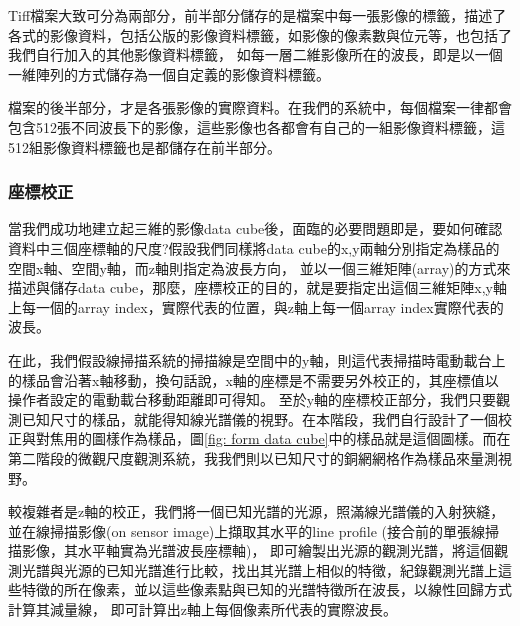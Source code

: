 \documentclass[12pt]{article}
\begin{document}
Tiff檔案大致可分為兩部分，前半部分儲存的是檔案中每一張影像的標籤，描述了各式的影像資料，包括公版的影像資料標籤，如影像的像素數與位元等，也包括了我們自行加入的其他影像資料標籤，
如每一層二維影像所在的波長，即是以一個一維陣列的方式儲存為一個自定義的影像資料標籤。

檔案的後半部分，才是各張影像的實際資料。在我們的系統中，每個檔案一律都會包含512張不同波長下的影像，這些影像也各都會有自己的一組影像資料標籤，這512組影像資料標籤也是都儲存在前半部分。

\subsubsection{座標校正}
當我們成功地建立起三維的影像data cube後，面臨的必要問題即是，要如何確認資料中三個座標軸的尺度?假設我們同樣將data cube的x,y兩軸分別指定為樣品的空間x軸、空間y軸，而z軸則指定為波長方向，
並以一個三維矩陣(array)的方式來描述與儲存data cube，那麼，座標校正的目的，就是要指定出這個三維矩陣x,y軸上每一個的array index，實際代表的位置，與z軸上每一個array index實際代表的波長。

在此，我們假設線掃描系統的掃描線是空間中的y軸，則這代表掃描時電動載台上的樣品會沿著x軸移動，換句話說，x軸的座標是不需要另外校正的，其座標值以操作者設定的電動載台移動距離即可得知。
至於y軸的座標校正部分，我們只要觀測已知尺寸的樣品，就能得知線光譜儀的視野。在本階段，我們自行設計了一個校正與對焦用的圖樣作為樣品，圖\ref{fig: form data cube}中的樣品就是這個圖樣。而在第二階段的微觀尺度觀測系統，我我們則以已知尺寸的銅網網格作為樣品來量測視野。

較複雜者是z軸的校正，我們將一個已知光譜的光源，照滿線光譜儀的入射狹縫，並在線掃描影像(on sensor image)上擷取其水平的line profile (接合前的單張線掃描影像，其水平軸實為光譜波長座標軸)，
即可繪製出光源的觀測光譜，將這個觀測光譜與光源的已知光譜進行比較，找出其光譜上相似的特徵，紀錄觀測光譜上這些特徵的所在像素，並以這些像素點與已知的光譜特徵所在波長，以線性回歸方式計算其減量線，
即可計算出z軸上每個像素所代表的實際波長。
\end{document}
